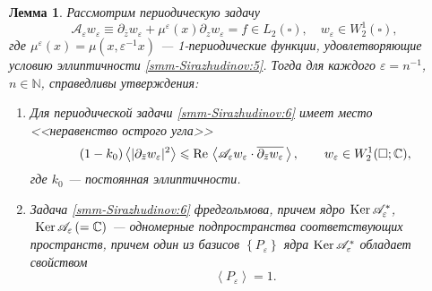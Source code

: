 \documentclass[a4paper,12pt]{article}
\newtheorem{lemma}[theorem]{Лемма}
\theoremstyle{definition}
\begin{document}
	\begin{lemma}\label{smm-lem1.5}
		Рассмотрим периодическую задачу
		\begin{equation}\label{smm-Sirazhudinov:6}
			\mathscr{A}_\varepsilon w_\varepsilon\equiv
			\partial_{\bar z}w_\varepsilon+\mu^\varepsilon(x)\partial_zw_\varepsilon
			=f\in L_2(\square),\quad w_\varepsilon\in W_2^1(\square),
		\end{equation}
		где $\mu^\varepsilon(x)=\mu(x,\varepsilon^{-1}x)$ 	--- {1}-периодические функции, удовлетворяющие условию эллиптичности \eqref{smm-Sirazhudinov:5}.
		Тогда для каждого $\varepsilon=n^{-1}$, $n\in \mathbb N$, справедливы утверждения:
		\begin{enumerate}
			\item[1)] Для периодической задачи \eqref{smm-Sirazhudinov:6} имеет место <<неравенство острого угла>>
			\begin{equation}\label{smm-Sirazhudinov:7}
				(1-k_0)\left<|\partial_{\bar{z}}w_\varepsilon|^2\right>\leqslant \text{Re\,}\left<\mathscr{A}_\varepsilon w_\varepsilon\cdot \overline{\partial_{\bar{z}}w_\varepsilon}\,\right>,\qquad  w_\varepsilon\in W_2^1(\square;\mathbb{C}),
			\end{equation}
			где $k_0$ --- постоянная эллиптичности.
			\item[2)] Задача \eqref{smm-Sirazhudinov:6} фредгольмова, причем ядро  $\text{Ker\,}\mathscr{A}_\varepsilon^\ast$, $\text{ Ker\,}\mathscr{A}_\varepsilon\,(=\mathbb{C})$
			--- одномерные подпространства соответствующих пространств,
			причем один из базисов $\left\{P_\varepsilon\right\}$ ядра
			$\text{Ker\,}\mathscr{A}_\varepsilon^\ast$ обладает свойством
			\begin{equation*}%
				\left<P_\varepsilon\right>=1.
			\end{equation*}
			\end{enumerate}
	\end{lemma}
\end{document}
